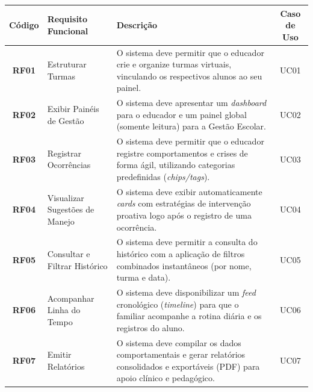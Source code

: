 \begin{quadro}[H]
    \centering
    \caption{Quadro de Requisitos Funcionais do Sistema}
    \label{quadro:requisitos_funcionais}
    \renewcommand{\arraystretch}{1.5} %
    \small %
    
    \begin{tabular}{|c|p{4cm}|p{7.5cm}|c|}
        \hline
        \textbf{Código} & \textbf{Requisito Funcional} & \textbf{Descrição} & \textbf{Caso de Uso} \\ \hline
        
        \textbf{RF01} & Estruturar Turmas & O sistema deve permitir que o educador crie e organize turmas virtuais, vinculando os respectivos alunos ao seu painel. & UC01 \\ \hline
        
        \textbf{RF02} & Exibir Painéis de Gestão & O sistema deve apresentar um \textit{dashboard} para o educador e um painel global (somente leitura) para a Gestão Escolar. & UC02 \\ \hline
        
        \textbf{RF03} & Registrar Ocorrências & O sistema deve permitir que o educador registre comportamentos e crises de forma ágil, utilizando categorias predefinidas (\textit{chips/tags}). & UC03 \\ \hline
        
        \textbf{RF04} & Visualizar Sugestões de Manejo & O sistema deve exibir automaticamente \textit{cards} com estratégias de intervenção proativa logo após o registro de uma ocorrência. & UC04 \\ \hline
        
        \textbf{RF05} & Consultar e Filtrar Histórico & O sistema deve permitir a consulta do histórico com a aplicação de filtros combinados instantâneos (por nome, turma e data). & UC05 \\ \hline
        
        \textbf{RF06} & Acompanhar Linha do Tempo & O sistema deve disponibilizar um \textit{feed} cronológico (\textit{timeline}) para que o familiar acompanhe a rotina diária e os registros do aluno. & UC06 \\ \hline
        
        \textbf{RF07} & Emitir Relatórios & O sistema deve compilar os dados comportamentais e gerar relatórios consolidados e exportáveis (PDF) para apoio clínico e pedagógico. & UC07 \\ \hline
        

\end{tabular}
\end{quadro}
